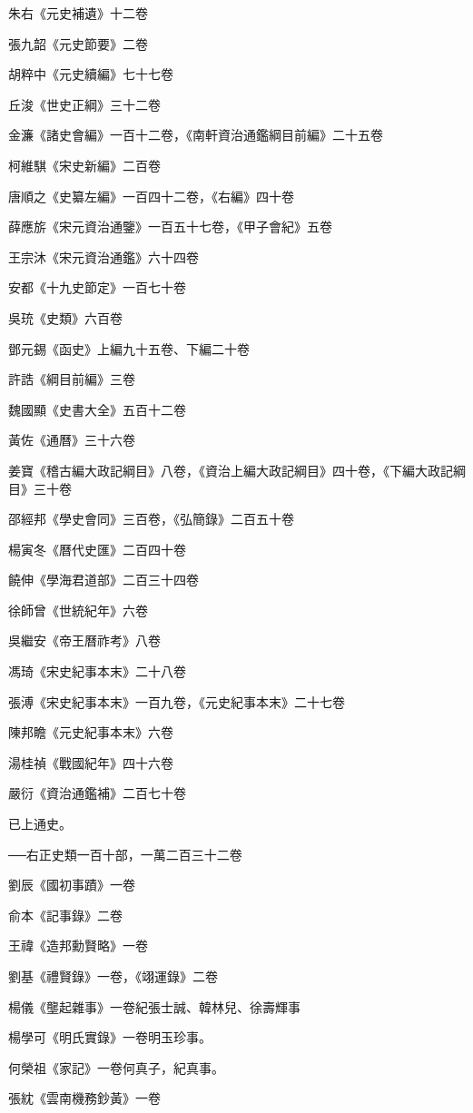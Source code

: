 朱右《元史補遺》十二卷

張九韶《元史節要》二卷

胡粹中《元史續編》七十七卷

丘浚《世史正綱》三十二卷

金濂《諸史會編》一百十二卷，《南軒資治通鑑綱目前編》二十五卷

柯維騏《宋史新編》二百卷

唐順之《史纂左編》一百四十二卷，《右編》四十卷

薛應旂《宋元資治通鑒》一百五十七卷，《甲子會紀》五卷

王宗沐《宋元資治通鑑》六十四卷

安都《十九史節定》一百七十卷

吳珫《史類》六百卷

鄧元錫《函史》上編九十五卷、下編二十卷

許誥《綱目前編》三卷

魏國顯《史書大全》五百十二卷

黃佐《通曆》三十六卷

姜寶《稽古編大政記綱目》八卷，《資治上編大政記綱目》四十卷，《下編大政記綱目》三十卷

邵經邦《學史會同》三百卷，《弘簡錄》二百五十卷

楊寅冬《曆代史匯》二百四十卷

饒伸《學海君道部》二百三十四卷

徐師曾《世統紀年》六卷

吳繼安《帝王曆祚考》八卷

馮琦《宋史紀事本末》二十八卷

張溥《宋史紀事本末》一百九卷，《元史紀事本末》二十七卷

陳邦瞻《元史紀事本末》六卷

湯桂禎《戰國紀年》四十六卷

嚴衍《資治通鑑補》二百七十卷

已上通史。

──右正史類一百十部，一萬二百三十二卷

劉辰《國初事蹟》一卷

俞本《記事錄》二卷

王禕《造邦勳賢略》一卷

劉基《禮賢錄》一卷，《翊運錄》二卷

楊儀《壟起雜事》一卷紀張士誠、韓林兒、徐壽輝事

楊學可《明氏實錄》一卷明玉珍事。

何榮祖《家記》一卷何真子，紀真事。

張紞《雲南機務鈔黃》一卷

